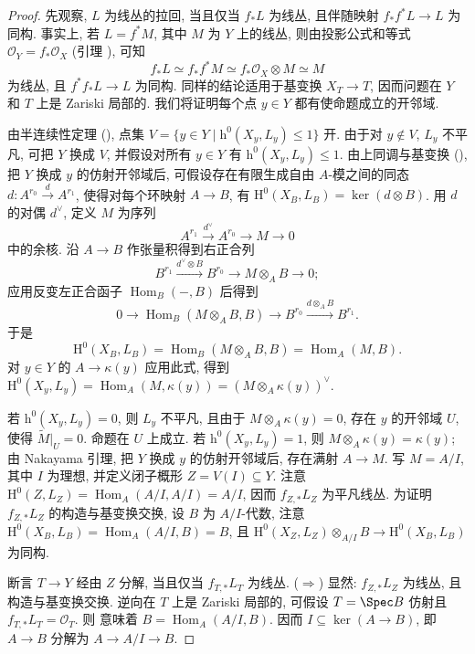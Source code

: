 \begin{proof}
先观察, $L$ 为线丛的拉回, 当且仅当 $f_*L$ 为线丛, 且伴随映射 $f_*f^*L\to L$ 为同构. 事实上, 若 $L=f^*M$, 其中 $M$ 为 $Y$ 上的线丛, 则由投影公式和等式 $\mathcal O_Y=f_*\mathcal O_X$ (引理 ), 可知
\[
f_*L\simeq f_*f^*M\simeq f_*\mathcal O_X\otimes M\simeq M
\]
为线丛, 且 $f^*f_*L\to L$ 为同构. 同样的结论适用于基变换 $X_T\to T$, 因而问题在 $Y$ 和 $T$ 上是 Zariski 局部的. 我们将证明每个点 $y\in Y$ 都有使命题成立的开邻域.

由半连续性定理 (), 点集 $V=\{y\in Y\mid\mathrm h^0(X_y,L_y)\leq1\}$ 开. 由于对 $y\notin V$, $L_y$ 不平凡, 可把 $Y$ 换成 $V$, 并假设对所有 $y\in Y$ 有 $\mathrm h^0(X_y,L_y)\leq1$. 由上同调与基变换 (), 把 $Y$ 换成 $y$ 的仿射开邻域后, 可假设存在有限生成自由 $A$-模之间的同态 $d:A^{r_0}\xrightarrow{d}A^{r_1}$, 使得对每个环映射 $A\to B$, 有 $\mathrm H^0(X_B,L_B)=\ker(d\otimes B)$. 用 $d$ 的对偶 $d^\vee$, 定义 $M$ 为序列
\[
A^{r_1}\xrightarrow{d^\vee}A^{r_0}\longrightarrow M\longrightarrow0
\]
中的余核. 沿 $A\to B$ 作张量积得到右正合列
\[
B^{r_1}\xrightarrow{d^\vee\otimes B}B^{r_0}\longrightarrow M\otimes_A B\longrightarrow0;
\]
应用反变左正合函子 $\operatorname{Hom}_B(-,B)$ 后得到
\[
0\longrightarrow\operatorname{Hom}_B(M\otimes_A B,B)\longrightarrow B^{r_0}\xrightarrow{d\otimes_A B}B^{r_1}.
\]
于是
\begin{equation}\label{src:A.6.19}
\mathrm H^0(X_B,L_B)=\operatorname{Hom}_B(M\otimes_A B,B)=\operatorname{Hom}_A(M,B).
\end{equation}
对 $y\in Y$ 的 $A\to\kappa(y)$ 应用此式, 得到 $\mathrm H^0(X_y,L_y)=\operatorname{Hom}_A(M,\kappa(y))=(M\otimes_A\kappa(y))^\vee$.

若 $\mathrm h^0(X_y,L_y)=0$, 则 $L_y$ 不平凡, 且由于 $M\otimes_A\kappa(y)=0$, 存在 $y$ 的开邻域 $U$, 使得 $\widetilde M|_U=0$. 命题在 $U$ 上成立. 若 $\mathrm h^0(X_y,L_y)=1$, 则 $M\otimes_A\kappa(y)=\kappa(y)$; 由 Nakayama 引理, 把 $Y$ 换成 $y$ 的仿射开邻域后, 存在满射 $A\to M$. 写 $M=A/I$, 其中 $I$ 为理想, 并定义闭子概形 $Z=V(I)\subseteq Y$. 注意 $\mathrm H^0(Z,L_Z)=\operatorname{Hom}_A(A/I,A/I)=A/I$, 因而 $f_{Z,*}L_Z$ 为平凡线丛. 为证明 $f_{Z,*}L_Z$ 的构造与基变换交换, 设 $B$ 为 $A/I$-代数, 注意 $\mathrm H^0(X_B,L_B)=\operatorname{Hom}_A(A/I,B)=B$, 且 $\mathrm H^0(X_Z,L_Z)\otimes_{A/I}B\to\mathrm H^0(X_B,L_B)$ 为同构.

断言 $T\to Y$ 经由 $Z$ 分解, 当且仅当 $f_{T,*}L_T$ 为线丛. ($\Rightarrow$) 显然: $f_{Z,*}L_Z$ 为线丛, 且构造与基变换交换. 逆向在 $T$ 上是 Zariski 局部的, 可假设 $T=\Spec B$ 仿射且 $f_{T,*}L_T=\mathcal O_T$. 则  意味着 $B=\operatorname{Hom}_A(A/I,B)$. 因而 $I\subseteq\ker(A\to B)$, 即 $A\to B$ 分解为 $A\to A/I\to B$.


\end{proof}
